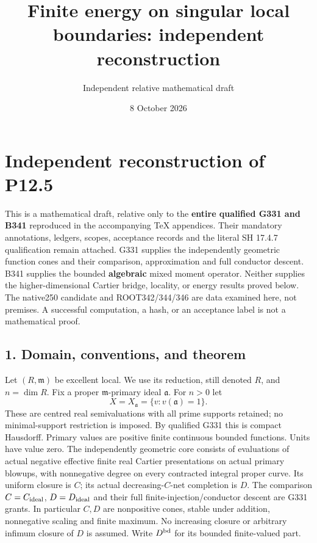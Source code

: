 \documentclass[
]{article}
\title{Finite energy on singular local boundaries: independent
reconstruction}
\author{Independent relative mathematical draft}
\date{8 October 2026}
\begin{document}
\maketitle

\section{Independent reconstruction of
P12.5}\label{independent-reconstruction-of-p12.5}

This is a mathematical draft, relative only to the \textbf{entire
qualified G331 and B341} reproduced in the accompanying TeX appendices.
Their mandatory annotations, ledgers, scopes, acceptance records and the
literal SH 17.4.7 qualification remain attached. G331 supplies the
independently geometric function cones and their comparison,
approximation and full conductor descent. B341 supplies the bounded
\textbf{algebraic} mixed moment operator. Neither supplies the
higher-dimensional Cartier bridge, locality, or energy results proved
below. The native250 candidate and ROOT342/344/346 are data examined
here, not premises. A successful computation, a hash, or an acceptance
label is not a mathematical proof.

\subsection{1. Domain, conventions, and
theorem}\label{domain-conventions-and-theorem}

Let \((R,\mathfrak m)\) be excellent local. We use its reduction, still
denoted \(R\), and \(n=\dim R\). Fix a proper \(\mathfrak m\)-primary
ideal \(\mathfrak a\). For \(n>0\) let
\[X=X_{\mathfrak a}=\{v:v(\mathfrak a)=1\}.\] These are centred real
semivaluations with all prime supports retained; no minimal-support
restriction is imposed. By qualified G331 this is compact Hausdorff.
Primary values are positive finite continuous bounded functions. Units
have value zero. The independently geometric core consists of
evaluations of actual negative effective finite real Cartier
presentations on actual primary blowups, with nonnegative degree on
every contracted integral proper curve. Its uniform closure is \(C\);
its actual decreasing-\(C\)-net completion is \(D\). The comparison
\(C=C_{\rm ideal}\), \(D=D_{\rm ideal}\) and their full
finite-injection/conductor descent are G331 grants. In particular
\(C,D\) are nonpositive cones, stable under addition, nonnegative
scaling and finite maximum. No increasing closure or arbitrary infimum
closure of \(D\) is assumed. Write \(D^{\rm bd}\) for its bounded
finite-valued part.
\end{document}
